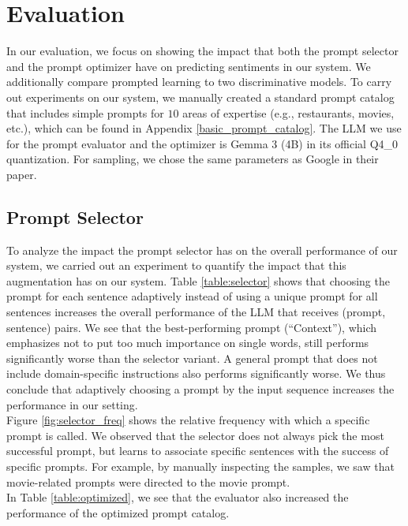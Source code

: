 \documentclass{article}
\theoremstyle{plain}
\theoremstyle{definition}
\theoremstyle{remark}
\begin{document}
\section{Evaluation}\label{evaluation}
In our evaluation, we focus on showing the impact that both the prompt selector and the prompt optimizer have on predicting sentiments in our system. We additionally compare prompted learning to two discriminative models.
To carry out experiments on our system, we manually created a standard prompt catalog that includes simple prompts for $10$ areas of expertise (e.g., restaurants, movies, etc.), which can be found in Appendix \ref{basic_prompt_catalog}. The LLM we use for the prompt evaluator and the optimizer is Gemma 3 (4B) \cite{gemma_2025} in its official Q4\_0 quantization. For sampling, we chose the same parameters as Google in their paper.
\subsection{Prompt Selector}\label{prompt_selector}

To analyze the impact the prompt selector has on the overall performance of our system, we carried out an experiment to quantify the impact that this augmentation has on our system.
Table \ref{table:selector} shows that choosing the prompt for each sentence adaptively instead of using a unique prompt for all sentences increases the overall performance of the LLM that receives (prompt, sentence) pairs. We see that the best-performing prompt (``Context''), which emphasizes not to put too much importance on single words, still performs significantly worse than the selector variant. A general prompt that does not include domain-specific instructions also performs significantly worse. We thus conclude that adaptively choosing a prompt by the input sequence increases the performance in our setting. \\

Figure \ref{fig:selector_freq} shows the relative frequency with which a specific prompt is called. We observed that the selector does not always pick the most successful prompt, but learns to associate specific sentences with the success of specific prompts. For example, by manually inspecting the samples, we saw that movie-related prompts were directed to the movie prompt. \\
In Table \ref{table:optimized}, we see that the evaluator also increased the performance of the optimized prompt catalog.
\end{document}
